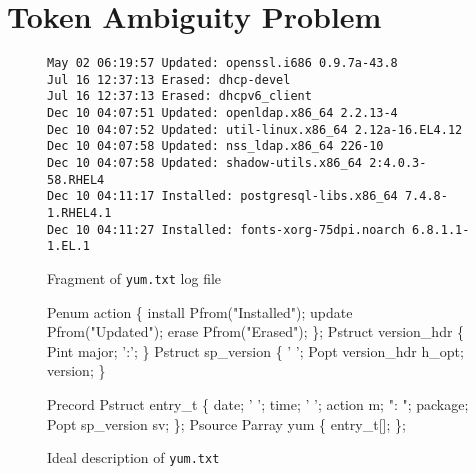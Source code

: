 \section{Token Ambiguity Problem} \label{sec:examples}
\begin{figure}[t]
\begin{center}
{\small
\begin{verbatim}
May 02 06:19:57 Updated: openssl.i686 0.9.7a-43.8
Jul 16 12:37:13 Erased: dhcp-devel
Jul 16 12:37:13 Erased: dhcpv6_client
Dec 10 04:07:51 Updated: openldap.x86_64 2.2.13-4
Dec 10 04:07:52 Updated: util-linux.x86_64 2.12a-16.EL4.12
Dec 10 04:07:58 Updated: nss_ldap.x86_64 226-10
Dec 10 04:07:58 Updated: shadow-utils.x86_64 2:4.0.3-58.RHEL4
Dec 10 04:11:17 Installed: postgresql-libs.x86_64 7.4.8-1.RHEL4.1
Dec 10 04:11:27 Installed: fonts-xorg-75dpi.noarch 6.8.1.1-1.EL.1
\end{verbatim}
}
\end{center}
\caption{Fragment of {\tt yum.txt} log file} \label{fig:yum}
\end{figure}

\begin{figure}[t]
\begin{minipage}[t]{0.5\columnwidth}
\begin{code}
Penum action \{
  install Pfrom("Installed");
  update Pfrom("Updated");
  erase Pfrom("Erased");
\};
Pstruct version_hdr \{
  Pint major; ':';
\}
Pstruct sp_version \{
  ' ';  
  Popt version_hdr h_opt;
   version;
\}
\end{code}
\end{minipage}
\hfill
\begin{minipage}[t]{0.5\columnwidth}
\begin{code}
Precord Pstruct entry_t \{
         date;	
  ' ';   time;	
  ' ';  action m; 	
  ": ";  package;	
        Popt sp_version sv;
\};
Psource Parray yum \{
        entry_t[];
\};
\end{code}
\end{minipage}
\caption{Ideal \pads{} description of {\tt yum.txt}}\label{fig:yum-gold}
\end{figure}


